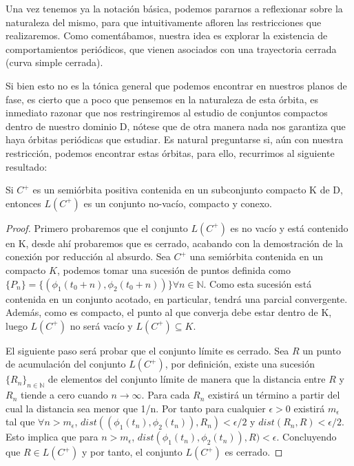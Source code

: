  Una vez tenemos ya la notación básica, podemos pararnos a reflexionar sobre la naturaleza del mismo, para que intuitivamente afloren las restricciones que realizaremos. Como comentábamos, nuestra idea es explorar la existencia de comportamientos periódicos, que vienen asociados con una trayectoria cerrada (curva simple cerrada).
 
  Si bien esto no es la tónica general que podemos encontrar en nuestros planos de fase, es cierto que a poco que pensemos en la naturaleza de esta órbita, es inmediato razonar que nos restringiremos al estudio de conjuntos compactos dentro de nuestro dominio D, nótese que de otra manera nada nos garantiza que haya órbitas periódicas que estudiar. Es natural preguntarse si, aún con nuestra restricción, podemos encontrar estas órbitas, para ello, recurrimos al siguiente resultado:
 \begin{theorem}[]
 	Si $C^+$ es un semiórbita positiva contenida en un subconjunto compacto K de D, entonces $L(C^+)$ es un conjunto no-vacío, compacto y conexo.
 	\begin{proof}
 		Primero probaremos que el conjunto $L(C^+)$ es no vacío y está contenido en K, desde ahí probaremos que es cerrado, acabando con la demostración de la conexión por reducción al absurdo.
 		Sea $C^+$ una semiórbita contenida en un compacto $K$, podemos tomar una sucesión de puntos definida como $\{P_n\}=\{(\phi_1(t_0+n),\phi_2(t_0+n))\} \forall n \in \mathbb{N}$. Como esta sucesión está contenida en un conjunto acotado, en particular, tendrá una parcial convergente. Además, como es compacto, el punto al que converja debe estar dentro de K, luego $L(C^+)$ no será vacío y $L(C^+) \subseteq K$.
 		
 		El siguiente paso será probar que el conjunto límite es cerrado.
 		Sea $R$ un punto de acumulación del conjunto $L(C^+)$, por definición, existe una sucesión $\{R_n\}_{n\in\mathbb{N}}$ de elementos del conjunto límite de manera que la distancia entre $R$ y $R_n$ tiende a cero cuando $n\to \infty$. Para cada $R_n$ existirá un término a partir del cual la distancia sea menor que 1/n. Por tanto para cualquier $\epsilon >0$ existirá  $m_\epsilon$ tal que $\forall n>m_\epsilon$, $ dist((\phi_1(t_n),\phi_2(t_n)),R_n)<\epsilon/2$ y $dist(R_n,R)<\epsilon/2$. Esto implica que para $n>m_\epsilon$, $ dist(\phi_1(t_n),\phi_2(t_n)),R)<\epsilon$. Concluyendo que $R\in L(C^+)$ y por tanto, el conjunto $L(C^+)$ es cerrado.
 		

\end{proof}
\end{theorem}
